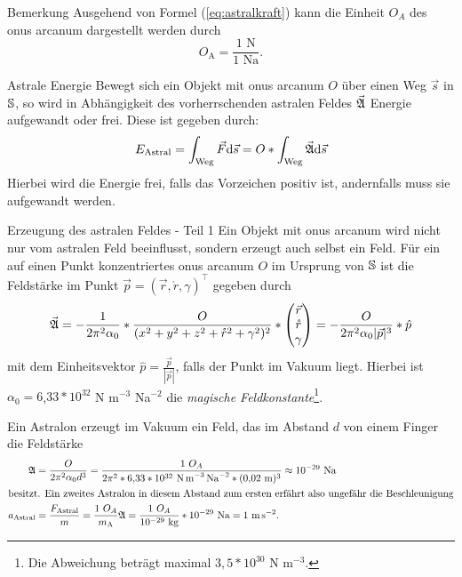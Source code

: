 \begin{bla}{Bemerkung}
Ausgehend von Formel (\ref{eq:astralkraft}) kann die Einheit $O_A$ des onus arcanum dargestellt werden durch
\begin{equation}
O_\text{A}=\frac{1\text{ N}}{1\text{ Na}}\text{.}
\end{equation}
\end{bla}
\begin{bla}{Astrale Energie}\label{astralenergie}
Bewegt sich ein Objekt mit onus arcanum $O$ über einen Weg $\vec{s}$ in $\mathbb{S}$, so wird in Abhängigkeit des vorherrschenden astralen Feldes $\vec{\mathfrak{A}}$ Energie aufgewandt oder frei. Diese ist gegeben durch:
\begin{equation}
E_\text{Astral}=\int_\text{Weg}\vec{F}\text{\rmfamily d} \vec{s}=O*\int_\text{Weg}\vec{\mathfrak{A}}\text{\rmfamily d} \vec{s}
\end{equation}
Hierbei wird die Energie frei, falls das Vorzeichen positiv ist, andernfalls muss sie aufgewandt werden.
\end{bla}
\begin{bla}{Erzeugung des astralen Feldes - Teil 1}
Ein Objekt mit onus arcanum wird nicht nur vom astralen Feld beeinflusst, sondern erzeugt auch selbst ein Feld. Für ein auf einen Punkt konzentriertes onus arcanum $O$ im Ursprung von $\mathbb{S}$ ist die Feldstärke im Punkt $\vec{p}=(\vec{r},\mathring{r},\gamma)^\top$ gegeben durch
\begin{equation}
\vec{\mathfrak{A}}=-\frac{1}{2\pi^2\alpha_0}*\frac{O}{(x^2+y^2+z^2+\mathring{r}^2+\gamma^2)^2}*\begin{pmatrix}\vec{r}\\\mathring{r}\\\gamma\end{pmatrix}=-\frac{O}{2\pi^2\alpha_0|\vec{p}|^3}*\hat{p}
\end{equation}
mit dem Einheitsvektor $\hat{p}=\frac{\vec{p}}{|\vec{p}|}$, falls der Punkt im Vakuum liegt. Hierbei ist $\alpha_0=6$,$33*10^{32}$ N\! m$^{-3}$\! Na$^{-2}$ die \emph{magische Feldkonstante}\footnote{Die Abweichung beträgt maximal $3,5*10^{30}$ N\! m$^{-3}$.}.
\end{bla}
\begin{bsp}
Ein Astralon erzeugt im Vakuum ein Feld, das im Abstand $d$ von einem Finger die Feldstärke
\begin{align*}
\mathfrak{A}&=\frac{O}{2\pi^2\alpha_0d^3}=\frac{1\text{ }O_A}{2\pi^2*6{,}33*10^{32}\text{ N\! m}^{-3}\text{\! Na}^{-2}*(0{,}02\text{ m})^3}\approx10^{-29}\text{ Na}\\
\intertext{besitzt. Ein zweites Astralon in diesem Abstand zum ersten erfährt also ungefähr die Beschleunigung}
a_\text{Astral}&=\frac{F_\text{Astral}}{m}=\frac{1\text{ }O_A}{m_\text{A}}\mathfrak{A}=\frac{1\text{ }O_A}{10^{-29}\text{ kg}}*10^{-29}\text{ Na}=1\text{ m\! s}^{-2}\text{.}
\end{align*}
\end{bsp}
